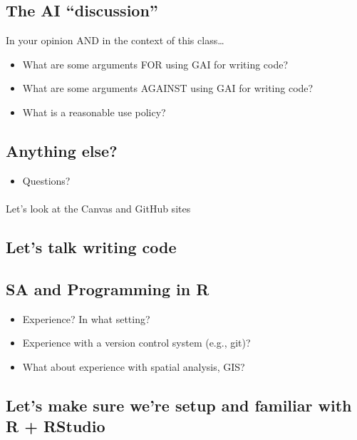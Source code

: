 \documentclass[
  letterpaper,
  DIV=11,
  numbers=noendperiod]{scrartcl}
\makeatletter
\let\oldparagraph\paragraph
\renewcommand{\paragraph}{
    \@ifstar
      \xxxParagraphStar
      \xxxParagraphNoStar
  }
\newcommand{\xxxParagraphStar}[1]{\oldparagraph*{#1}\mbox{}}
\newcommand{\xxxParagraphNoStar}[1]{\oldparagraph{#1}\mbox{}}
\providecommand{\tightlist}{%
  \setlength{\itemsep}{0pt}\setlength{\parskip}{0pt}}
\makeatother
\begin{document}
\subsection{The AI ``discussion''}\label{the-ai-discussion}

In your opinion AND in the context of this class\ldots{}

\begin{itemize}
\item
  What are some arguments FOR using GAI for writing code?
\item
  What are some arguments AGAINST using GAI for writing code?
\item
  What is a reasonable use policy?
\end{itemize}

\subsection{Anything else?}\label{anything-else}

\begin{itemize}
\tightlist
\item
  Questions?
\end{itemize}

\paragraph{Let's look at the Canvas and GitHub
sites}\label{lets-look-at-the-canvas-and-github-sites}

\subsection{Let's talk writing code}\label{lets-talk-writing-code}

\subsection{SA and Programming in R}\label{sa-and-programming-in-r}

\begin{itemize}
\tightlist
\item
  Experience? In what setting?
\item
  Experience with a version control system (e.g., git)?
\item
  What about experience with spatial analysis, GIS?
\end{itemize}

\subsection{Let's make sure we're setup and familiar with R +
RStudio}\label{lets-make-sure-were-setup-and-familiar-with-r-rstudio}
\end{document}
